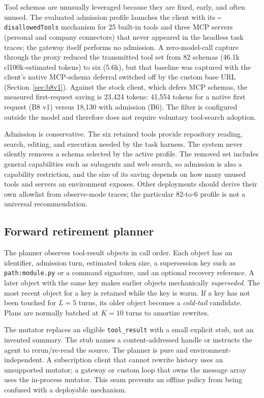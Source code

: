 \documentclass[10pt,twocolumn]{article}
\begin{document}
Tool schemas are unusually leveraged because they are fixed, early, and often unused.  The evaluated
admission profile launches the client with its \texttt{--disallowedTools} mechanism for 25 built-in
tools and three MCP servers (personal and company connectors) that never appeared in the headless task
traces; the gateway itself performs no admission.  A zero-model-call capture through the proxy reduced
the transmitted tool set from 82 schemas (46.1k cl100k-estimated tokens) to six (5.6k), but that
baseline was captured with the client's native MCP-schema deferral switched off by the custom base URL
(Section~\ref{sec:b8v1}).  Against the stock client, which defers MCP schemas, the measured
first-request saving is 23,424 tokens: 41,554 tokens for a native first request (B8 v1) versus 18,130
with admission (B6).  The filter is configured outside the model and therefore does not require
voluntary tool-search adoption.

Admission is conservative.  The six retained tools provide repository reading, search, editing, and
execution needed by the task harness.  The system never silently removes a schema selected by the
active profile.  The removed set includes general capabilities such as subagents and web search, so
admission is also a capability restriction, and the size of its saving depends on how many unused tools
and servers an environment exposes.  Other deployments should derive their own allowlist from
observe-mode traces; the particular 82-to-6 profile is not a universal recommendation.

\subsection{Forward retirement planner}

The planner observes tool-result objects in call order.  Each object has an identifier, admission
turn, estimated token size, a supersession key such as \texttt{path:module.py} or a command signature,
and an optional recovery reference.  A later object with the same key makes earlier objects
mechanically \emph{superseded}.  The most recent object for a key is retained while the key is warm.
If a key has not been touched for $L=5$ turns, its older object becomes a \emph{cold-tail} candidate.
Plans are normally batched at $K=10$ turns to amortize rewrites.

The mutator replaces an eligible \texttt{tool\_result} with a small explicit stub, not an invented
summary.  The stub names a content-addressed handle or instructs the agent to rerun/re-read the source.
The planner is pure and environment-independent.  A subscription client that cannot rewrite history
uses an unsupported mutator; a gateway or custom loop that owns the message array uses the in-process
mutator.  This seam prevents an offline policy from being confused with a deployable mechanism.
\end{document}
